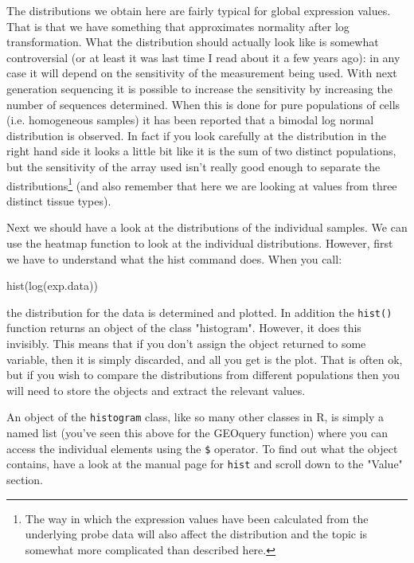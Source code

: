 \documentclass[11pt]{article}
\begin{document}
The distributions we obtain here are fairly typical for global
expression values. That is that we have something that approximates
normality after log transformation. What the distribution should
actually look like is somewhat controversial (or at least it was
last time I read about it a few years ago): in any case it will depend
on the sensitivity of the measurement being used. With next generation
sequencing it is possible to increase the sensitivity by increasing
the number of sequences determined. When this is done for pure populations
of cells (i.e. homogeneous samples) it has been reported that a bimodal
log normal distribution is observed. In fact if you look carefully at
the distribution in the right hand side it looks a little bit like it
is the sum of two distinct populations, but the sensitivity of the
array used isn't really good enough to separate the distributions\footnote{
The way in which the expression values have been calculated from the
underlying probe data will also affect the distribution and the topic is
somewhat more complicated than described here.}
(and also remember that here we are looking at values from three
distinct tissue types).

Next we should have a look at the distributions of the individual
samples. We can use the heatmap function to look at the individual
distributions. However, first we have to understand what the
hist command does. When you call:

\begin{rcode}
  hist(log(exp.data))
\end{rcode}

the distribution for the data is determined and plotted. In addition
the \texttt{hist()} function returns an object of the class "histogram".
However, it does this invisibly. This means that if you don't assign
the object returned to some variable, then it is simply discarded,
and all you get is the plot. That is often ok, but if you wish to 
compare the distributions from different populations then you will
need to store the objects and extract the relevant values.

An object of the \texttt{histogram} class, like so many other classes
in R, is simply a named list (you've seen this above for the GEOquery
function) where you can access the individual elements using the \texttt{\$}
operator. To find out what the object contains, have a look at the 
manual page for \texttt{hist} and scroll down to the "Value" section.
\end{document}
